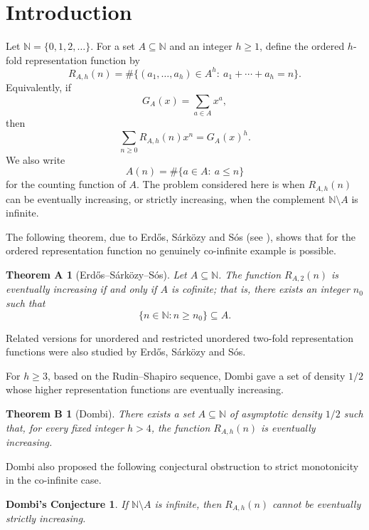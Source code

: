 \documentclass[11pt]{amsart}
\newtheorem*{theoremA}{Theorem A}
\newtheorem*{theoremB}{Theorem B}
\newtheorem*{conjectureD}{Dombi's Conjecture}
\theoremstyle{remark}
\theoremstyle{plain}
\begin{document}
\maketitle
\section{Introduction}

Let $\mathbb N=\{0,1,2,\ldots\}$. For a set $A\subseteq \mathbb N$ and an integer $h\ge 1$, define the ordered $h$-fold representation function by
\[
R_{A,h}(n)=\#\{(a_1,\ldots,a_h)\in A^h:\ a_1+\cdots+a_h=n\}.
\]
Equivalently, if
\[
G_A(x)=\sum_{a\in A}x^a,
\]
then
\[
\sum_{n\ge 0}R_{A,h}(n)x^n=G_A(x)^h.
\]
We also write
\[
A(n)=\#\{a\in A:\ a\le n\}
\]
for the counting function of $A$. The problem considered here is when $R_{A,h}(n)$ can be eventually increasing, or strictly increasing, when the complement $\mathbb N\setminus A$ is infinite.

The following theorem, due to Erd\H{o}s, S\'{a}rk\"{o}zy and S\'{o}s (see \cite{ESS4,ESS5}), shows that for the ordered representation function no genuinely co-infinite example is possible.

\begin{theoremA}[Erd\H{o}s--S\'{a}rk\"{o}zy--S\'{o}s]
Let $A\subseteq \mathbb N$. The function $R_{A,2}(n)$ is eventually increasing if and only if $A$ is cofinite; that is, there exists an integer $n_0$ such that
\[
\{n\in\mathbb N:n\ge n_0\}\subseteq A.
\]
\end{theoremA}

Related versions for unordered and restricted unordered two-fold representation functions were also studied by Erd\H{o}s, S\'{a}rk\"{o}zy and S\'{o}s.

For $h\ge 3$, based on the Rudin--Shapiro sequence, Dombi \cite{Dombi} gave a set of density $1/2$ whose higher representation functions are eventually increasing.

\begin{theoremB}[Dombi]
There exists a set $A\subseteq \mathbb N$ of asymptotic density $1/2$ such that, for every fixed integer $h>4$, the function $R_{A,h}(n)$ is eventually increasing.
\end{theoremB}

Dombi \cite{Dombi} also proposed the following conjectural obstruction to strict monotonicity in the co-infinite case.

\begin{conjectureD}
If $\mathbb N\setminus A$ is infinite, then $R_{A,h}(n)$ cannot be eventually strictly increasing.
\end{conjectureD}
\end{document}
